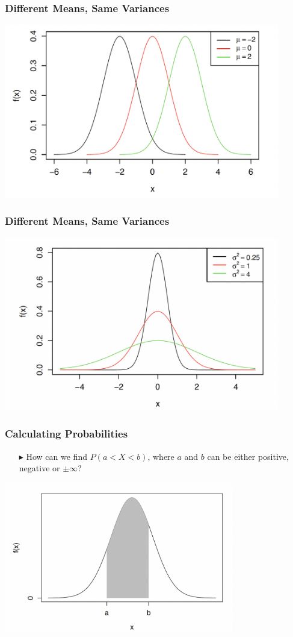 \documentclass[12pt]{beamer}
\begin{document}
\begin{frame}
	\frametitle{Different Means, Same Variances}
	\centering
\includegraphics[width=12cm]{normal2.png}
\end{frame}
\begin{frame}
	\frametitle{Different Means, Same Variances}
	\centering
	\includegraphics[width=12cm]{normal3.png}
\end{frame}
\begin{frame}
	\frametitle{Calculating Probabilities}
	\begin{itemize}
	\item[\color{blue}$\blacktriangleright$] How can we find $P(a < X < b)$, where $a$ and $b$ can be either positive, negative or $\pm\infty$?
	
	
\end{itemize}
	\centering
	\includegraphics[width=10cm]{normal4.png}
\end{frame}
\end{document}
